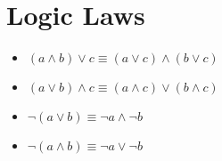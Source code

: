 \documentclass{article}
\begin{document}
\section{Logic Laws}
\begin{itemize}
	\item $(a \land b) \lor c \equiv (a \lor c) \land (b \lor c)$
	\item $(a \lor b) \land c \equiv (a \land c) \lor (b \land c)$
	\item $\lnot (a \lor b) \equiv \lnot a \land \lnot b$
	\item $\lnot (a \land b) \equiv \lnot a \lor \lnot b$
\end{itemize}
\end{document}

